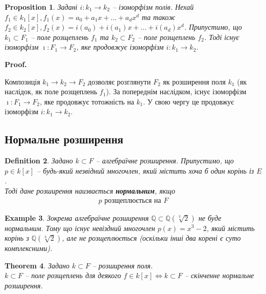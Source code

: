 \documentclass[a4paper, 10pt]{article}
\makeatletter
\theoremstyle{theoremdd}
\newtheorem{theorem}{Theorem}[subsection]
\theoremstyle{theoremdd}
\newtheorem{definition}[theorem]{Definition}
\theoremstyle{theoremdd}
\theoremstyle{theoremdd}
\theoremstyle{theoremdd}
\newtheorem{example}[theorem]{Example}
\theoremstyle{theoremdd}
\theoremstyle{theoremdd}
\theoremstyle{theoremdd}
\theoremstyle{theoremdd}
\newtheorem{proposition}[theorem]{Proposition}
\theoremstyle{theoremdd}
\theoremstyle{theoremdd}
\theoremstyle{theoremdd}
\theoremstyle{theoremdd}
\theoremstyle{theoremdd}
\theoremstyle{theoremdd}
\renewenvironment{proof}[1][Proof.\\]{\par
\pushQED{\hfill \qed}%
\normalfont \topsep6\p@\@plus6\p@\relax
\trivlist
\item\relax
{\bfseries
#1\@addpunct{.}}\hspace\labelsep\ignorespaces
}{%
\popQED\endtrivlist\@endpefalse
}
\makeatother
\begin{document}
\begin{proposition}
Задані $i \colon k_1 \to k_2$ -- ізоморфізм полів. Нехай $f_1 \in k_1[x], f_1(x) = a_0 + a_1 x + \dots + a_d x^d$ та також $f_2 \in k_2[x], f_2(x) = i(a_0) + i(a_1) x + \dots + i(a_d) x^d$. Припустимо, що $k_1 \subset F_1$ -- поле розщеплень $f_1$ та $k_2 \subset F_2$ -- поле розщеплень $f_2$. Тоді існує ізоморфізм $\imath \colon F_1 \to F_2$, яке продовжує ізоморфізм $i \colon k_1 \to k_2$.
\end{proposition}

\begin{proof}
\begin{figure}[H]
\centering
{}
\end{figure}
Композиція $k_1 \to k_2 \to F_2$ дозволяє розглянути $F_2$ як розширення поля $k_1$ (як наслідок, як поле розщеплень $f_1$). За попереднім наслідком, існує ізоморфізм $\imath \colon F_1 \to F_2$, яке продовжує тотожність на $k_1$. У свою чергу це продовжує ізоморфізм $i \colon k_1 \to k_2$.
\end{proof}

\subsection{Нормальне розширення}
\begin{definition}
Задано $k \subset F$ -- алгебраїчне розширення. Припустимо, що $p \in k[x]$ -- будь-який незвідний многочлен, який містить хоча б один корінь із $E$.\\
Тоді дане розширення наизвається \textbf{нормальним}, якщо
\begin{align*}
p \text{ розщеплюється на } F
\end{align*}
\end{definition}

\begin{example}
Зокрема алгебраїчне розширення $\mathbb{Q} \subset \mathbb{Q}(\sqrt[3]{2})$ не буде нормальним. Тому що існує невіздний многочлен $p(x) = x^3 - 2$, який містить корінь з $\mathbb{Q}(\sqrt[3]{2})$, але не розщеплюється (оскільки інші два корені є суто комплексними).
\end{example}

\begin{theorem}
Задано $k \subset F$ -- розширення поля.\\
$k \subset F$ -- поле розщеплень для деякого $f \in k[x] \iff k \subset F$ -- скінченне нормальне розширення.
\end{theorem}
\end{document}
